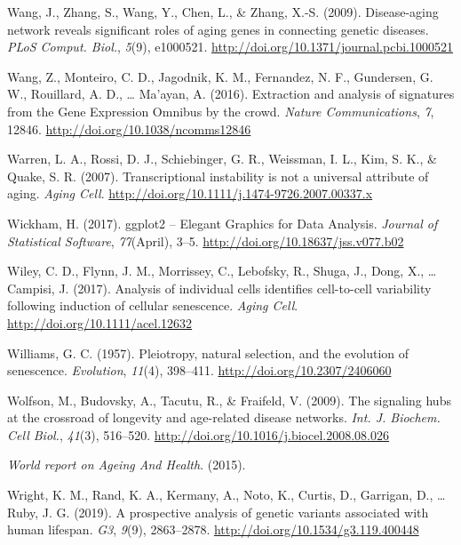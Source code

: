 \documentclass[12pt,twoside]{unicam}
\begin{document}
\begin{cslreferences}
\leavevmode\hypertarget{ref-Wang2009}{}%
Wang, J., Zhang, S., Wang, Y., Chen, L., \& Zhang, X.-S. (2009). Disease-aging network reveals significant roles of aging genes in connecting genetic diseases. \emph{PLoS Comput. Biol.}, \emph{5}(9), e1000521. \url{http://doi.org/10.1371/journal.pcbi.1000521}

\leavevmode\hypertarget{ref-Wang2016}{}%
Wang, Z., Monteiro, C. D., Jagodnik, K. M., Fernandez, N. F., Gundersen, G. W., Rouillard, A. D., \ldots{} Ma'ayan, A. (2016). Extraction and analysis of signatures from the Gene Expression Omnibus by the crowd. \emph{Nature Communications}, \emph{7}, 12846. \url{http://doi.org/10.1038/ncomms12846}

\leavevmode\hypertarget{ref-Warren2007}{}%
Warren, L. A., Rossi, D. J., Schiebinger, G. R., Weissman, I. L., Kim, S. K., \& Quake, S. R. (2007). Transcriptional instability is not a universal attribute of aging. \emph{Aging Cell}. \url{http://doi.org/10.1111/j.1474-9726.2007.00337.x}

\leavevmode\hypertarget{ref-Wickham2017}{}%
Wickham, H. (2017). ggplot2 -- Elegant Graphics for Data Analysis. \emph{Journal of Statistical Software}, \emph{77}(April), 3--5. \url{http://doi.org/10.18637/jss.v077.b02}

\leavevmode\hypertarget{ref-Wiley2017}{}%
Wiley, C. D., Flynn, J. M., Morrissey, C., Lebofsky, R., Shuga, J., Dong, X., \ldots{} Campisi, J. (2017). Analysis of individual cells identifies cell-to-cell variability following induction of cellular senescence. \emph{Aging Cell}. \url{http://doi.org/10.1111/acel.12632}

\leavevmode\hypertarget{ref-Williams1957}{}%
Williams, G. C. (1957). Pleiotropy, natural selection, and the evolution of senescence. \emph{Evolution}, \emph{11}(4), 398--411. \url{http://doi.org/10.2307/2406060}

\leavevmode\hypertarget{ref-Wolfson2009}{}%
Wolfson, M., Budovsky, A., Tacutu, R., \& Fraifeld, V. (2009). The signaling hubs at the crossroad of longevity and age-related disease networks. \emph{Int. J. Biochem. Cell Biol.}, \emph{41}(3), 516--520. \url{http://doi.org/10.1016/j.biocel.2008.08.026}

\leavevmode\hypertarget{ref-WHO2015}{}%
\emph{World report on Ageing And Health}. (2015).

\leavevmode\hypertarget{ref-Wright2019}{}%
Wright, K. M., Rand, K. A., Kermany, A., Noto, K., Curtis, D., Garrigan, D., \ldots{} Ruby, J. G. (2019). A prospective analysis of genetic variants associated with human lifespan. \emph{G3}, \emph{9}(9), 2863--2878. \url{http://doi.org/10.1534/g3.119.400448}


\end{cslreferences}
\end{document}
